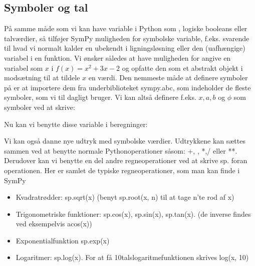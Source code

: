 \documentclass[letterpaper,10pt,english]{jupyterBook}
\begin{document}
\subsection{Symboler og tal}
\label{\detokenize{notebooks/sympy/Notebook2:symboler-og-tal}}
På samme måde som vi kan have variable i Python som , logiske booleans eller talværdier, så tilføjer SymPy muligheden for symbolske variable, f.eks. svarende til hvad vi normalt kalder en ubekendt i ligningsløsning eller den (uafhængige) variabel i en funktion. Vi ønsker således at have muligheden for angive en variabel som \(x\) i \(f(x) = x^2+3x-2\) og opfatte den som et abstrakt objekt i modsætning til at tildele \(x\) en værdi. Den nemmeste måde at definere symboler på er at importere dem fra underbiblioteket sympy.abc, som indeholder de fleste symboler, som vi til dagligt bruger. Vi kan altså definere f.eks. \(x, a, b\) og \(\phi\) som symboler ved at skrive:

\begin{sphinxVerbatim}[commandchars=\\\{\}]
      
\end{sphinxVerbatim}

Nu kan vi benytte disse variable i beregninger:

\begin{sphinxVerbatim}[commandchars=\\\{\}]
     
\end{sphinxVerbatim}

\noindent{}

Vi kan også danne nye udtryk med symbolske værdier. Udtrykkene kan sættes sammen ved at benytte normale Python\sphinxhyphen{}operationer såsom: +, \sphinxhyphen{}, *,/ eller **. Derudover kan vi benytte en del andre regneoperationer ved at skrive sp. foran operationen.
Her er samlet de typiske regneoperationer, som man kan finde i SymPy
\begin{itemize}
\item {} 
Kvadratrødder: sp.sqrt(x) (benyt sp.root(x, n) til at tage n’te rod af x)

\item {} 
Trigonometriske funktioner: sp.cos(x), sp.sin(x), sp.tan(x). (de inverse findes ved eksempelvis acos(x))

\item {} 
Exponentialfunktion sp.exp(x)

\item {} 
Logaritmer: sp.log(x). For at få 10\sphinxhyphen{}talslogaritmefunktionen skrives log(x, 10)

\end{itemize}
\end{document}
